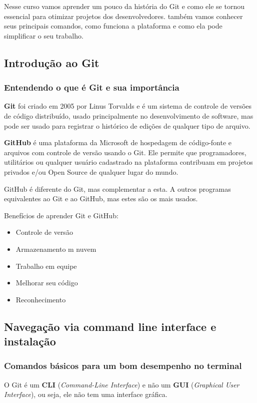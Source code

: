 \documentclass[12pt,a4paper]{article}
\begin{document}
	Nesse curso vamos aprender um pouco da história do Git e como ele se tornou essencial para otimizar projetos dos desenvolvedores. também vamos conhecer seus principais comandos, como funciona a plataforma e como ela pode simplificar o seu trabalho.
	
	\subsection{Introdução ao Git}
	
	\subsubsection{Entendendo o que é Git e sua importância}
	
	\textbf{Git} foi criado em 2005 por Linus Torvalds e é um sistema de controle de versões de código distribuído, usado principalmente no desenvolvimento de software, mas pode ser usado para registrar o histórico de edições de qualquer tipo de arquivo. 
	
	\textbf{GitHub} é uma plataforma da Microsoft de hospedagem de código-fonte e arquivos com controle de versão usando o Git. Ele permite que programadores, utilitários ou qualquer usuário cadastrado na plataforma contribuam em projetos privados e/ou Open Source de qualquer lugar do mundo.
	
	GitHub é diferente do Git, mas complementar a esta. A outros programas equivalentes ao Git e ao GitHub, mas estes são os mais usados.
	
	Benefícios de aprender Git e GitHub:
	
	\begin{itemize}
		\item Controle de versão
		\item Armazenamento m nuvem
		\item Trabalho em equipe
		\item Melhorar seu código
		\item Reconhecimento
	\end{itemize}
	
	\subsection{Navegação via command line interface e instalação}
	
	\subsubsection{Comandos básicos para um bom desempenho no terminal}
	O Git é um \textbf{CLI} (\textit{Command-Line Interface}) e não um \textbf{GUI} (\textit{Graphical User Interface}), ou seja, ele não tem uma interface gráfica.
	
\end{document}
